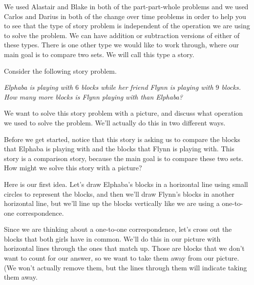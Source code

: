 \documentclass{ximera}
\begin{document}
We used Alastair and Blake in both of the part-part-whole problems and we used Carlos and Darius in both of the change over time problems in order to help you to see that the type of story problem is independent of the operation we are using to solve the problem. We can have addition or subtraction versions of either of these types. There is one other type we would like to work through, where our main goal is to compare two sets. We will call this type a  story.

\begin{example}
Consider the following story problem.

\emph{Elphaba is playing with $6$ blocks while her friend Flynn is playing with $9$ blocks. How many more blocks is Flynn playing with than Elphaba?}

We want to solve this story problem with a picture, and discuss what operation we used to solve the problem. We'll actually do this in two different ways.

Before we get started, notice that this story is asking us to compare the blocks that Elphaba is playing with and the blocks that Flynn is playing with. This story is a comparison story, because the main goal is to compare these two sets. How might we solve this story with a picture?

Here is our first idea. Let's draw Elphaba's blocks in a horizontal line using small circles to represent the blocks, and then we'll draw Flynn's blocks in another horizontal line, but we'll line up the blocks vertically like we are using a one-to-one correspondence.

\begin{center}
\end{center}

Since we are thinking about a one-to-one correspondence, let's cross out the blocks that both girls have in common. We'll do this in our picture with horizontal lines through the ones that match up. Those are blocks that we don't want to count for our answer, so we want to take them away from our picture. (We won't actually remove them, but the lines through them will indicate taking them away.


\end{example}
\end{document}
